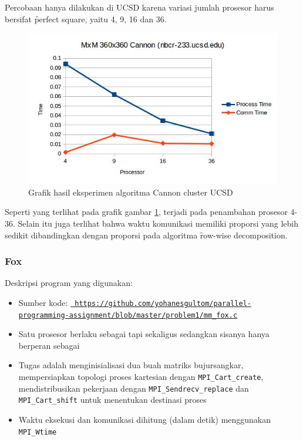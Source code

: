 Percobaan hanya dilakukan di \cluster UCSD karena variasi jumlah prosesor harus bersifat \f{perfect square}, yaitu 4, 9, 16 dan 36. 

\begin{figure}
	\centering
	\includegraphics[width=1\textwidth]
	{pics/chart_mm_cannon_nbcr}
	\caption{Grafik hasil eksperimen algoritma Cannon cluster UCSD}
	\label{fig:result_mm_cannon_nbcr}
\end{figure}  

Seperti yang terlihat pada grafik gambar \ref{fig:result_mm_cannon_nbcr}, terjadi \speedup pada penambahan prosesor 4-36. Selain itu juga terlihat bahwa waktu komunikasi memiliki proporsi yang lebih sedikit dibandingkan dengan proporsi pada algoritma \f{row-wise decomposition}.

\subsubsection{Fox}

Deskripsi program yang digunakan:
\begin{itemize}
	\item Sumber kode: \texttt{\url{ https://github.com/yohanesgultom/parallel-programming-assignment/blob/master/problem1/mm_fox.c}}
	\item Satu prosesor berlaku sebagai \manager tapi sekaligus \worker sedangkan sisanya hanya berperan sebagai \worker 
	\item Tugas \manager adalah menginisialisasi dua buah matriks bujursangkar, mempersiapkan topologi proses kartesian dengan \verb|MPI_Cart_create|, mendistribusikan pekerjaan dengan \verb|MPI_Sendrecv_replace| dan \verb|MPI_Cart_shift| untuk menentukan destinasi proses
	\item Waktu eksekusi dan komunikasi dihitung (dalam detik) menggunakan \verb|MPI_Wtime|
\end{itemize}

